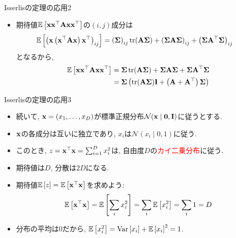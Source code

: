 \documentclass[dvipdfmx,notheorems,t]{beamer}
\begin{document}
\begin{frame}{Isserlisの定理の応用2}
\begin{itemize}
  \item 期待値$\operatorname{\mathbb{E}} \left[ \vb{x} \vb{x}^\top \vb{A} \vb{x} \vb{x}^\top \right]$の$(i, j)$成分は
  \begin{align*}
    \operatorname{\mathbb{E}} \left[ \left( \vb{x} \left( \vb{x}^\top \vb{A} \vb{x} \right) \vb{x}^\top \right)_{ij} \right]
    &= \left( \vb{\Sigma} \right)_{ij} \tr(\vb{A} \vb{\Sigma})
      + \left( \vb{\Sigma} \vb{A} \vb{\Sigma} \right)_{ij}
      + \left( \vb{\Sigma} \vb{A}^\top \vb{\Sigma} \right)_{ij}
  \end{align*}
  となるから,
  \begin{align*}
    \operatorname{\mathbb{E}} \left[ \vb{x} \vb{x}^\top \vb{A} \vb{x} \vb{x}^\top \right]
    &= \vb{\Sigma} \tr(\vb{A} \vb{\Sigma})
      + \vb{\Sigma} \vb{A} \vb{\Sigma} + \vb{\Sigma} \vb{A}^\top \vb{\Sigma} \\
    &= \vb{\Sigma} \left( \tr(\vb{A} \vb{\Sigma}) \vb{I}
      + \left( \vb{A} + \vb{A}^\top \right) \vb{\Sigma} \right)
  \end{align*}
\end{itemize}
\end{frame}

\begin{frame}{Isserlisの定理の応用3}
\begin{itemize}
  \item 続いて, $\vb{x} = (x_1, \ldots, x_D)$が標準正規分布$\mathcal{N}(\vb{x} \mid \vb{0}, \vb{I})$に従うとする.
  \item $\vb{x}$の各成分は互いに独立であり, $x_i$は$\mathcal{N}(x_i \mid 0, 1)$に従う.
  \item このとき, $z = \vb{x}^\top \vb{x} = \sum_{i = 1}^D x_i^2$は,
  自由度$D$の\textcolor{red}{カイ二乗分布}に従う.
  \item 期待値は$D$, 分散は$2D$になる.
  \item 期待値$\operatorname{\mathbb{E}} \left[ z \right] = \operatorname{\mathbb{E}} \left[ \vb{x}^\top \vb{x} \right]$を求めよう:
  \begin{align*}
    \operatorname{\mathbb{E}} \left[ \vb{x}^\top \vb{x} \right] = \operatorname{\mathbb{E}} \left[ \sum_i x_i^2 \right] = \sum_i \operatorname{\mathbb{E}} \left[ x_i^2 \right] = \sum_i 1 = D
  \end{align*}
  \item 分布の平均は0だから, $\operatorname{\mathbb{E}} \left[ x_i^2 \right] = \operatorname{Var} \left[ x_i \right] + \operatorname{\mathbb{E}} \left[ x_i \right]^2 = 1$.
\end{itemize}
\end{frame}
\end{document}
